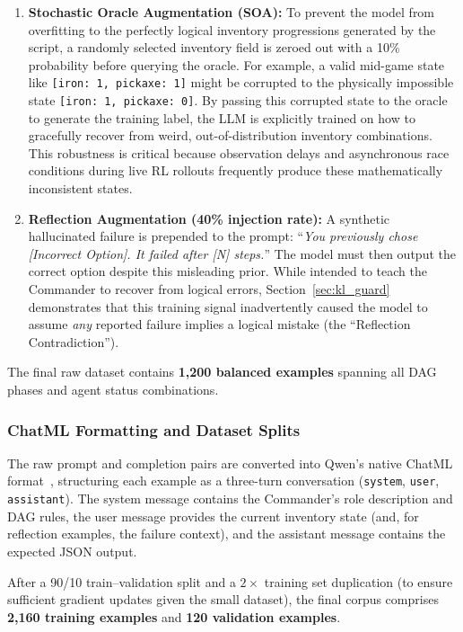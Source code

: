 \begin{enumerate}
    \item \textbf{Stochastic Oracle Augmentation (SOA):} To prevent the model from overfitting to the perfectly logical inventory progressions generated by the script, a randomly selected inventory field is zeroed out with a 10\% probability before querying the oracle. For example, a valid mid-game state like \texttt{[iron: 1, pickaxe: 1]} might be corrupted to the physically impossible state \texttt{[iron: 1, pickaxe: 0]}. By passing this corrupted state to the oracle to generate the training label, the LLM is explicitly trained on how to gracefully recover from weird, out-of-distribution inventory combinations. This robustness is critical because observation delays and asynchronous race conditions during live RL rollouts frequently produce these mathematically inconsistent states.
    \item \textbf{Reflection Augmentation (40\% injection rate):} A synthetic hallucinated failure is prepended to the prompt: ``\emph{You previously chose [Incorrect Option]. It failed after [N] steps.}'' The model must then output the correct option despite this misleading prior. While intended to teach the Commander to recover from logical errors, Section~\ref{sec:kl_guard} demonstrates that this training signal inadvertently caused the model to assume \emph{any} reported failure implies a logical mistake (the ``Reflection Contradiction'').
\end{enumerate}

The final raw dataset contains \textbf{1,200 balanced examples} spanning all DAG phases and agent status combinations.

\subsubsection{ChatML Formatting and Dataset Splits}

The raw prompt and completion pairs are converted into Qwen's native ChatML format~\parencite{Yang_Li_Yang_Zhang_Hui_Zheng_Yu_Gao_Huang_Lv_et_al._2025}, structuring each example as a three-turn conversation (\texttt{system}, \texttt{user}, \texttt{assistant}). The system message contains the Commander's role description and DAG rules, the user message provides the current inventory state (and, for reflection examples, the failure context), and the assistant message contains the expected JSON output.

After a 90/10 train--validation split and a $2\times$ training set duplication (to ensure sufficient gradient updates given the small dataset), the final corpus comprises \textbf{2,160 training examples} and \textbf{120 validation examples}.

